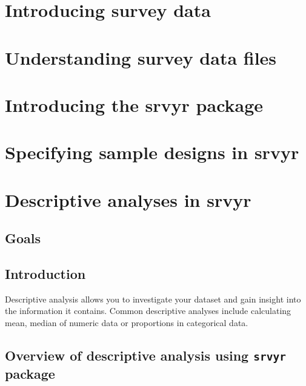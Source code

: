 \documentclass[
]{krantz}
\begin{document}
\hypertarget{c02}{%
\chapter{Introducing survey data}\label{c02}}

\hypertarget{c03}{%
\chapter{Understanding survey data files}\label{c03}}

\hypertarget{c04}{%
\chapter{Introducing the srvyr package}\label{c04}}

\hypertarget{c05}{%
\chapter{Specifying sample designs in srvyr}\label{c05}}

\hypertarget{c06}{%
\chapter{Descriptive analyses in srvyr}\label{c06}}

\hypertarget{goals}{%
\section{Goals}\label{goals}}

\hypertarget{introduction}{%
\section{Introduction}\label{introduction}}

Descriptive analysis allows you to investigate your dataset and gain insight into the information it contains. Common descriptive analyses include calculating mean, median of numeric data or proportions in categorical data.

\hypertarget{overview-of-descriptive-analysis-using-srvyr-package}{%
\section{\texorpdfstring{Overview of descriptive analysis using \texttt{srvyr} package}{Overview of descriptive analysis using srvyr package}}\label{overview-of-descriptive-analysis-using-srvyr-package}}
\end{document}
